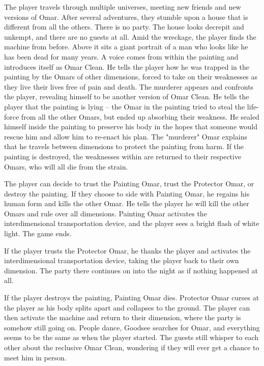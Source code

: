 The player travels through multiple universes, meeting new friends and new versions of Omar. After several adventures, they stumble upon a house that is different from all the others. There is no party. The house looks decrepit and unkempt, and there are no guests at all. Amid the wreckage, the player finds the machine from before. Above it sits a giant portrait of a man who looks like he has been dead for many years. A voice comes from within the painting and introduces itself as Omar Clean. He tells the player how he was trapped in the painting by the Omars of other dimensions, forced to take on their weaknesses as they live their lives free of pain and death. The murderer appears and confronts the player, revealing himself to be another version of Omar Clean. He tells the player that the painting is lying -- the Omar in the painting tried to steal the life-force from all the other Omars, but ended up absorbing their weakness. He sealed himself inside the painting to preserve his body in the hopes that someone would rescue him and allow him to re-enact his plan. The "murderer" Omar explains that he travels between dimensions to protect the painting from harm. If the painting is destroyed, the weaknesses within are returned to their respective Omars, who will all die from the strain.

The player can decide to trust the Painting Omar, trust the Protector Omar, or destroy the painting. If they choose to side with Painting Omar, he regains his human form and kills the other Omar. He tells the player he will kill the other Omars and rule over all dimensions. Painting Omar activates the interdimensional transportation device, and the player sees a bright flash of white light. The game ends.

If the player trusts the Protector Omar, he thanks the player and activates the interdimensional transportation device, taking the player back to their own dimension. The party there continues on into the night as if nothing happened at all.

If the player destroys the painting, Painting Omar dies. Protector Omar curses at the player as his body splits apart and collapses to the ground. The player can then activate the machine and return to their dimension, where the party is somehow still going on. People dance, Goodsee searches for Omar, and everything seems to be the same as when the player started. The guests still whisper to each other about the reclusive Omar Clean, wondering if they will ever get a chance to meet him in person.